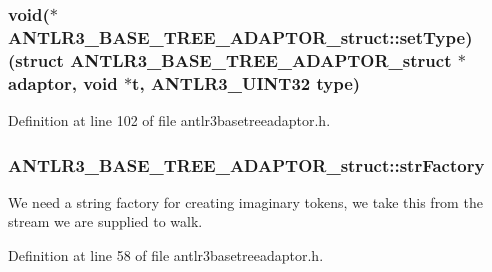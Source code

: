 \hypertarget{struct_a_n_t_l_r3___b_a_s_e___t_r_e_e___a_d_a_p_t_o_r__struct_a6c10c8802ca601ac8f707ab0de5ff795}{
\subsubsection[{set\-Type}]{\setlength{\rightskip}{0pt plus 5cm}void($\ast$ A\-N\-T\-L\-R3\-\_\-\-B\-A\-S\-E\-\_\-\-T\-R\-E\-E\-\_\-\-A\-D\-A\-P\-T\-O\-R\-\_\-struct\-::set\-Type)(struct {\bf A\-N\-T\-L\-R3\-\_\-\-B\-A\-S\-E\-\_\-\-T\-R\-E\-E\-\_\-\-A\-D\-A\-P\-T\-O\-R\-\_\-struct} $\ast$adaptor, void $\ast${\bf t}, {\bf A\-N\-T\-L\-R3\-\_\-\-U\-I\-N\-T32} {\bf type})}}\label{struct_a_n_t_l_r3___b_a_s_e___t_r_e_e___a_d_a_p_t_o_r__struct_a6c10c8802ca601ac8f707ab0de5ff795}


Definition at line 102 of file antlr3basetreeadaptor.\-h.

\hypertarget{struct_a_n_t_l_r3___b_a_s_e___t_r_e_e___a_d_a_p_t_o_r__struct_a1d0f9410b986257f740faa368ee9caf0}{
\subsubsection[{str\-Factory}]{ A\-N\-T\-L\-R3\-\_\-\-B\-A\-S\-E\-\_\-\-T\-R\-E\-E\-\_\-\-A\-D\-A\-P\-T\-O\-R\-\_\-struct\-::str\-Factory}}\label{struct_a_n_t_l_r3___b_a_s_e___t_r_e_e___a_d_a_p_t_o_r__struct_a1d0f9410b986257f740faa368ee9caf0}
We need a string factory for creating imaginary tokens, we take this from the stream we are supplied to walk. 

Definition at line 58 of file antlr3basetreeadaptor.\-h.

